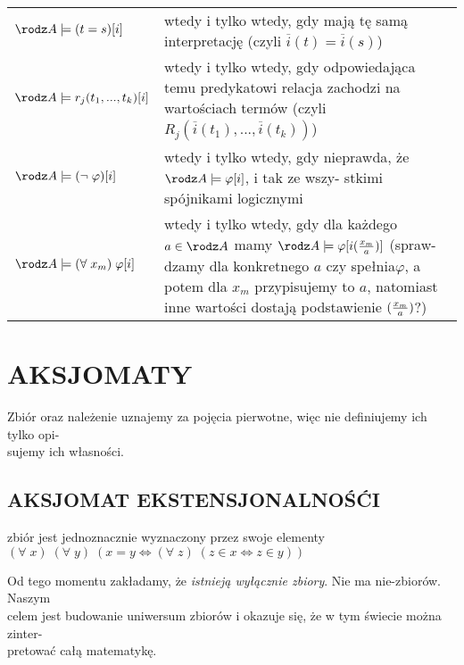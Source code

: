 \documentclass{article}
\begin{document}
\begin{tabular} { m{3cm} m{15cm} }
    {\color{acc}$\rodz A\models (t=s)[i]$} & wtedy i tylko wtedy, gdy mają tę samą interpretację (czyli $\overline i(t)=\overline i(s)$)\\
    {\color{acc}$\rodz A\models r_j(t_1,...,t_k)[i]$} & wtedy i tylko wtedy, gdy odpowiedająca temu predykatowi relacja zachodzi na wartościach termów (czyli $R_j(\overline i (t_1), ..., \overline i (t_k))$)\\
    {\color{acc}$\rodz A \models (\neg\;\varphi)[i]$} & \makecell[tl]{wtedy i tylko wtedy, gdy nieprawda, że $\rodz A \models \varphi[i]$, i tak ze wszy-\\stkimi spójnikami logicznymi}\\
    {\color{acc}$\rodz A\models (\forall\;x_m)\;\varphi[i]$} & \makecell[tl]{wtedy i tylko wtedy, gdy dla każdego $a\in \rodz A$ mamy $\rodz A\models \varphi[i({x_m\over a})]$ (spraw-\\dzamy dla konkretnego $a$ czy spełnia$\varphi$, a potem dla $x_m$ przypisujemy to \\$a$, natomiast inne wartości dostają podstawienie $({x_m\over a})$?)}
\end{tabular}

\section{AKSJOMATY}
{\color{emp}Zbiór oraz należenie} uznajemy za {\color{emp}pojęcia pierwotne}, więc nie definiujemy ich tylko opi-\\sujemy ich własności.

\subsection{AKSJOMAT EKSTENSJONALNOŚĆI}
\begin{center}
    zbiór jest jednoznacznie wyznaczony przez swoje elementy\smallskip\\
    $(\forall\;x)\;(\forall\;y)\;(x=y\iff(\forall\;z)\;(z\in x\iff z\in y))$
\end{center}\medskip
Od tego momentu zakładamy, że \emph{\color{emp}istnieją wyłącznie zbiory}. Nie ma nie-zbiorów. Naszym \\celem jest budowanie uniwersum zbiorów i okazuje się, że w tym świecie można zinter-\\pretować całą matematykę.
\end{document}
